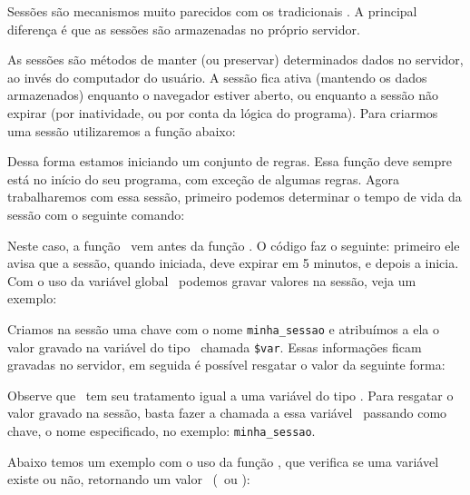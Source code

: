 Sessões são mecanismos muito parecidos com os tradicionais \cookies. A principal diferença é 
que as sessões são armazenadas no próprio servidor.

As sessões são métodos de manter (ou preservar) determinados dados no servidor, ao invés do computador 
do usuário. A sessão fica ativa (mantendo os dados armazenados) enquanto o navegador estiver aberto, 
ou enquanto a sessão não expirar (por inatividade, ou por conta da lógica do programa). Para criarmos 
uma sessão utilizaremos a função abaixo:



Dessa forma estamos iniciando um conjunto de regras. Essa função deve sempre está no início do 
seu programa, com exceção de algumas regras. Agora trabalharemos com essa sessão, primeiro podemos 
determinar o tempo de vida da sessão com o seguinte comando:



Neste caso, a função \funcaosessioncache~vem antes da função \funcaosessionstart. O código faz
o seguinte: primeiro ele avisa que a sessão, quando iniciada, deve expirar em 5 minutos, e depois a inicia.
Com o uso da variável global \variavelsession~podemos gravar valores na sessão, veja um exemplo:



Criamos na sessão uma chave com o nome \texttt{minha\_sessao} e atribuímos a ela o valor gravado na 
variável do tipo \tipostring~chamada \texttt{\$var}. Essas informações ficam gravadas no servidor, 
em seguida é possível resgatar o valor da seguinte forma:



Observe que \variavelsession~tem seu tratamento igual a uma variável do tipo \tipoarray. Para resgatar 
o valor gravado na sessão, basta fazer a chamada a essa variável \variavelsession~passando como chave, o nome 
especificado, no exemplo: \texttt{minha\_sessao}.

Abaixo temos um exemplo com o uso da função \funcaoisset, que verifica se uma variável 
existe ou não, retornando um valor \booleano~(\true~ou \false):



